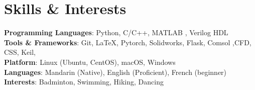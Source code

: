 \documentclass[letterpaper,11pt]{article}
\begin{document}
\section{\textbf{Skills \& Interests}}
\textbf{Programming Languages}{: Python, C/C++, MATLAB , Verilog HDL} \\
\textbf{Tools \& Frameworks}{: Git, LaTeX, Pytorch, Solidworks, Flask, Comsol ,CFD, CSS, Keil, } \\
\textbf{Platform}: Linux (Ubuntu, CentOS), macOS, Windows \\
\textbf{Languages}: Mandarin (Native), English (Proficient), French (beginner) \\
\textbf{Interests}{: Badminton, Swimming, Hiking, Dancing}
\vspace{-160pt}
\end{document}

